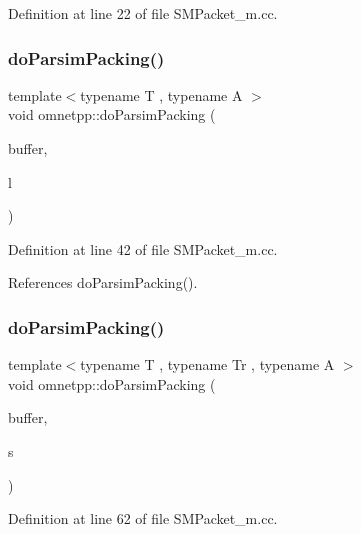 Definition at line 22 of file S\+M\+Packet\+\_\+m.\+cc.

\mbox{\label{namespaceomnetpp_a1043d9829c084411066b9e9469d75942}} 
\subsubsection{\texorpdfstring{do\+Parsim\+Packing()}{doParsimPacking()}\hspace{0.1cm}{\footnotesize\ttfamily [2/5]}}
{\footnotesize\ttfamily template$<$typename T , typename A $>$ \\
void omnetpp\+::do\+Parsim\+Packing (\begin{DoxyParamCaption}\item[{omnetpp\+::c\+Comm\+Buffer $\ast$}]{buffer,  }\item[{const std\+::list$<$ T, A $>$ \&}]{l }\end{DoxyParamCaption})}



Definition at line 42 of file S\+M\+Packet\+\_\+m.\+cc.



References do\+Parsim\+Packing().

\mbox{\label{namespaceomnetpp_a44c0e632aecd37f539392e96147deef0}} 
\subsubsection{\texorpdfstring{do\+Parsim\+Packing()}{doParsimPacking()}\hspace{0.1cm}{\footnotesize\ttfamily [3/5]}}
{\footnotesize\ttfamily template$<$typename T , typename Tr , typename A $>$ \\
void omnetpp\+::do\+Parsim\+Packing (\begin{DoxyParamCaption}\item[{omnetpp\+::c\+Comm\+Buffer $\ast$}]{buffer,  }\item[{const std\+::set$<$ T, Tr, A $>$ \&}]{s }\end{DoxyParamCaption})}



Definition at line 62 of file S\+M\+Packet\+\_\+m.\+cc.



